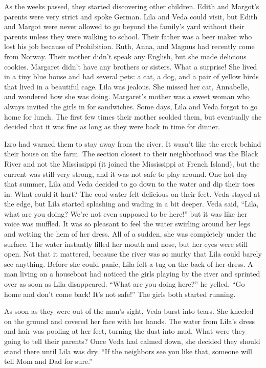 \documentclass[
  american,
  letterpaper,
]{book}
\begin{document}
As the weeks passed, they started discovering other children. Edith and
Margot's parents were very strict and spoke German. Lila and Veda could
visit, but Edith and Margot were never allowed to go beyond the family's
yard without their parents unless they were walking to school. Their
father was a beer maker who lost his job because of Prohibition. Ruth,
Anna, and Magnus had recently come from Norway. Their mother didn't
speak any English, but she made delicious cookies. Margaret didn't have
any brothers or sisters. What a surprise! She lived in a tiny blue house
and had several pets: a cat, a dog, and a pair of yellow birds that
lived in a beautiful cage. Lila was jealous. She missed her cat,
Annabelle, and wondered how she was doing. Margaret's mother was a sweet
woman who always invited the girls in for sandwiches. Some days, Lila
and Veda forgot to go home for lunch. The first few times their mother
scolded them, but eventually she decided that it was fine as long as
they were back in time for dinner.

Izro had warned them to stay away from the river. It wasn't like the
creek behind their house on the farm. The section closest to their
neighborhood was the Black River and not the Mississippi (it joined the
Mississippi at French Island), but the current was still very strong,
and it was not safe to play around. One hot day that summer, Lila and
Veda decided to go down to the water and dip their toes in. What could
it hurt? The cool water felt delicious on their feet. Veda stayed at the
edge, but Lila started splashing and wading in a bit deeper. Veda said,
``Lila, what are you doing? We're not even supposed to be here!'' but it
was like her voice was muffled. It was so pleasant to feel the water
swirling around her legs and wetting the hem of her dress. All of a
sudden, she was completely under the surface. The water instantly filled
her mouth and nose, but her eyes were still open. Not that it mattered,
because the river was so murky that Lila could barely see anything.
Before she could panic, Lila felt a tug on the back of her dress. A man
living on a houseboat had noticed the girls playing by the river and
sprinted over as soon as Lila disappeared. ``What are you doing here?''
he yelled. ``Go home and don't come back! It's not safe!'' The girls
both started running.

As soon as they were out of the man's sight, Veda burst into tears. She
kneeled on the ground and covered her face with her hands. The water
from Lila's dress and hair was pooling at her feet, turning the dust
into mud. What were they going to tell their parents? Once Veda had
calmed down, she decided they should stand there until Lila was dry.
``If the neighbors see you like that, someone will tell Mom and Dad for
sure.''
\end{document}
